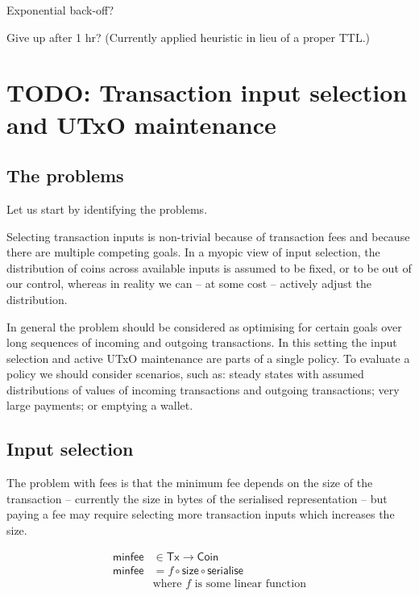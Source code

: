 \documentclass{article}
\begin{document}
Exponential back-off?

Give up after 1 hr? (Currently applied heuristic in lieu of a proper TTL.)

\section{TODO: Transaction input selection and UTxO maintenance}

\subsection{The problems}

Let us start by identifying the problems.

Selecting transaction inputs is non-trivial because of transaction fees and
because there are multiple competing goals. In a myopic view of input
selection, the distribution of coins across available inputs is assumed to be
fixed, or to be out of our control, whereas in reality we can -- at some cost
-- actively adjust the distribution.

In general the problem should be considered as optimising for certain goals
over long sequences of incoming and outgoing transactions. In this setting
the input selection and active UTxO maintenance are parts of a single policy.
To evaluate a policy we should consider scenarios, such as: steady states with
assumed distributions of values of incoming transactions and outgoing
transactions; very large payments; or emptying a wallet.

\subsection{Input selection}

The problem with fees is that the minimum fee depends on the size of the transaction
-- currently the size in bytes of the serialised representation -- but paying a
fee may require selecting more transaction inputs which increases the size.

\begin{equation}
\begin{split}
\mathsf{minfee} & \in \mathsf{Tx} \to \mathsf{Coin} \\
\mathsf{minfee} & = f \circ \mathsf{size} \circ \mathsf{serialise} \\
             & \text{where } f \text{ is some linear function}
\end{split}
\end{equation}
\end{document}
